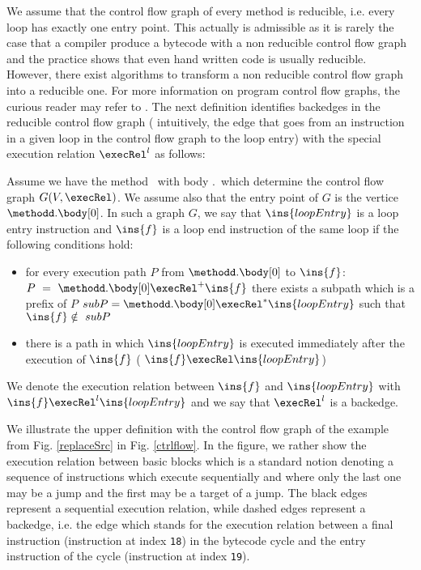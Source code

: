 We assume that the control flow graph of every method is reducible, i.e. every loop has exactly one entry point. This actually is admissible
as it is rarely the case that a compiler produce a bytecode with a non reducible control flow graph and the practice shows that even hand written
code is usually reducible. However, there exist algorithms to transform a non reducible control flow graph into a reducible one. 
For more information on program control flow graphs, the curious reader may refer to \cite{ARUCom1986}.
The next definition identifies backedges in the reducible control flow graph ( intuitively, the edge that goes 
from an instruction in a given loop in the control flow graph to the loop entry)  with the special execution relation $\execRel^l$ as follows:
 
\begin{defLoop}
\label{defLoop}
Assume we have the method \methodd \ with body \methodd.\body \ which determine the control flow graph $G(V, \execRel) $.  We assume also 
that the entry point of $G$ is the vertice  $\methodd.\body[0]$.
 In such a graph $G$, we say that $\ins{loopEntry}$ is a loop entry instruction and $\ins{f}$ is a loop end instruction
 of the same loop if the following conditions hold:
\begin{itemize}
\item for every execution path $P$ from $\methodd.\body[0]$ to  $\ins{f}$:   $P~=~\methodd.\body[0] \execRel^{+} \ins{f}$
 there exists a subpath which is a prefix of $P$  $subP = \methodd.\body[0] \execRel^{*} \ins{loopEntry}$ such that $\ins{f} \notin  \ subP  $
\item there is a path in which $\ins{loopEntry}$  is executed immediately after the execution of $\ins{f}$ ( $\ins{f} \execRel \ins{loopEntry}$)
\end{itemize}
We denote the execution relation between $\ins{f}$ and  $\ins{loopEntry}$ with \\
$\ins{f} \execRel^l \ins{loopEntry}$ and we say that $  \execRel^l $  is a backedge. 
\end{defLoop}
We illustrate the upper definition with the control flow graph of the example from Fig. \ref{replaceSrc} in Fig. \ref{ctrlflow}.
In the figure, we rather show the execution relation between basic blocks which is a standard notion denoting a sequence of instructions which execute sequentially
and  where only the last one may be a jump and the first may be a target of a jump. 
The black edges represent a sequential execution relation, while dashed edges represent a backedge, i.e. the edge which stands for the execution
relation between a final instruction (instruction at index \texttt{18}) in the bytecode cycle and the entry instruction of the cycle (instruction at index \texttt{19}).  

